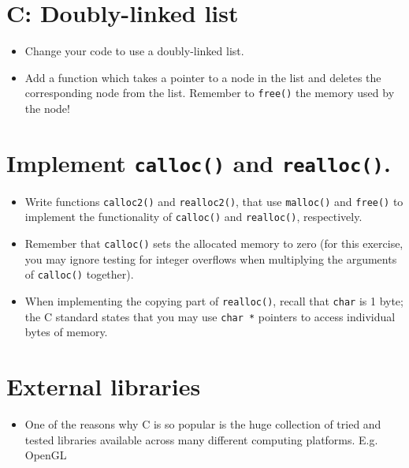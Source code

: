 \documentclass{article}
\begin{document}
\section{C: Doubly-linked list}
\begin{itemize}
\item Change your code to use a doubly-linked list.
\item Add a function which takes a pointer to a node in the list and deletes the corresponding node from the list. Remember to \verb!free()! the memory used by the node!
\end{itemize}



\section{Implement \texttt{calloc()} and \texttt{realloc()}.}
\begin{itemize}
\item Write functions \verb!calloc2()! and \verb!realloc2()!, that use \verb!malloc()! and \verb!free()! to implement the functionality of \verb!calloc()! and \verb!realloc()!, respectively.
\item Remember that \verb!calloc()! sets the allocated memory to zero (for this exercise, you may ignore testing for integer overflows when multiplying the arguments of \verb!calloc()! together).
\item When implementing the copying part of \verb!realloc()!, recall that \verb!char! is 1 byte; the C standard states that you may use \verb!char *! pointers to access individual bytes of memory.
\end{itemize}



\section{External libraries}
\begin{itemize}
\item One of the reasons why C is so popular is the huge collection of tried and tested libraries available across many different computing platforms.  E.g.  OpenGL
\end{itemize}
\end{document}
